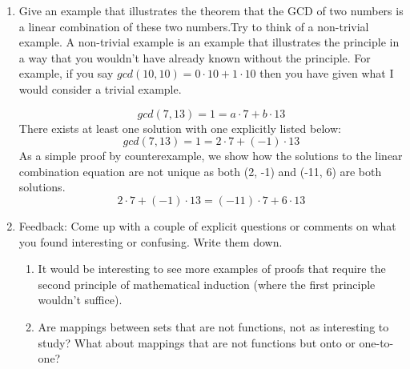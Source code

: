 \documentclass{article}
\begin{document}
\begin{enumerate}
\item Give an example that illustrates the theorem that the GCD of two numbers is a linear combination of these two numbers.Try to think of a non-trivial example. A non-trivial example is an example that illustrates the principle in a way that you wouldn't have already known without the principle. For example, if you say $gcd(10,10) = 0\cdot 10+1\cdot 10$ then you have given what I would consider a trivial example.

\begin{flushleft}
$$ gcd(7,13) = 1 = a \cdot 7 + b \cdot 13 $$
There exists at least one solution with one explicitly listed below:
$$ gcd(7,13) = 1 = 2 \cdot 7 + (-1) \cdot 13 $$
As a simple proof by counterexample, we show how the solutions to the linear combination equation are not unique as both (2, -1) and (-11, 6) are both solutions.
$$ 2 \cdot 7 + (-1) \cdot 13 = (-11) \cdot 7 + 6 \cdot 13 $$
\end{flushleft}

\item Feedback: Come up with a couple of explicit questions or comments on what you found interesting or confusing. Write them down.

\begin{flushleft}
\begin{enumerate}
    \item It would be interesting to see more examples of proofs that require the second principle of mathematical induction (where the first principle wouldn't suffice).
    \item Are mappings between sets that are not functions, not as interesting to study? What about mappings that are not functions but onto or one-to-one?
\end{enumerate}
\end{flushleft}

\end{enumerate}
\end{document}
